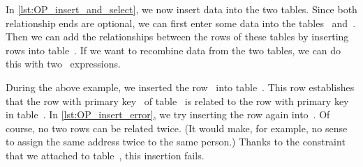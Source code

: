 In \cref{lst:OP_insert_and_select}, we now insert data into the two tables.
Since both relationship ends are optional, we can first enter some data into the tables~ and~.
Then we can add the relationships between the rows of these tables by inserting rows into table~.
If we want to recombine data from the two tables, we can do this with two ~expressions.

During the above example, we inserted the row~ into table~.
This row establishes that the row with primary key~ of table~ is related to the row with primary key~ in table~.
In \cref{lst:OP_insert_error}, we try inserting the row again into~.
Of course, no two rows can be related twice.
(It would make, for example, no sense to assign the same address twice to the same person.)
Thanks to the  constraint that we attached to table~, this insertion fails.%
%
\FloatBarrier%
\endhsection%
%
